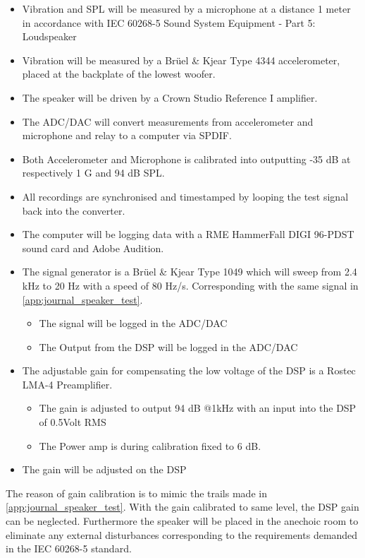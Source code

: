 \begin{itemize}
\item Vibration and \gls{SPL} will be measured by a microphone at a distance 1 meter in accordance with IEC 60268-5 Sound System Equipment - Part 5: Loudspeaker
\item Vibration will be measured by a Brüel \& Kjear Type 4344 accelerometer, placed at the backplate of the lowest woofer.
\item The speaker will be driven by a Crown Studio Reference I amplifier.
\item The ADC/DAC will convert measurements from accelerometer and microphone and relay to a computer via SPDIF.
\item Both Accelerometer and Microphone is calibrated into outputting -35 dB at respectively 1 G and 94 dB \gls{SPL}.
\item All recordings are synchronised and timestamped by looping the test signal back into the converter.
\item The computer will be logging data with a RME HammerFall DIGI 96-PDST sound card and Adobe Audition.
\item The signal generator is a Brüel \& Kjear Type 1049 which will sweep from 2.4 kHz to 20 Hz with a speed of 80 Hz/s. Corresponding with the same signal in \autoref{app:journal_speaker_test}.
\begin{itemize}
	\item The signal will be logged in the ADC/DAC
	\item The Output from the DSP will be logged in the ADC/DAC
\end{itemize}
\item The adjustable gain for compensating the low voltage of the DSP is a Rostec LMA-4 Preamplifier.
\begin{itemize}
	\item The gain is adjusted to output 94 dB @1kHz with an input into the DSP of 0.5Volt RMS
	\item The Power amp is during calibration fixed to 6 dB.
\end{itemize}
\item The gain will be adjusted on the DSP
\end{itemize}

The reason of gain calibration is to mimic the trails made in \autoref{app:journal_speaker_test}. With the gain calibrated to same level, the DSP gain can be neglected.  Furthermore the speaker will be placed in the anechoic room to eliminate any external disturbances corresponding to the requirements demanded in the IEC 60268-5 standard.

